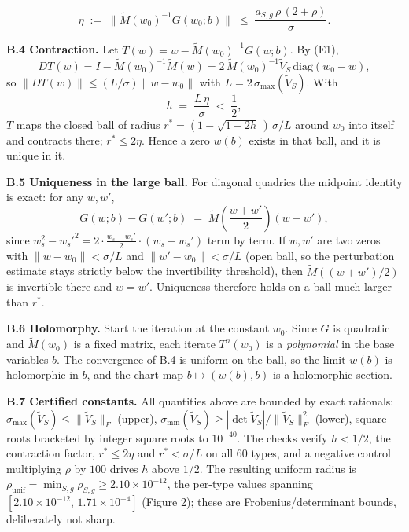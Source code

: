 \[\eta \;:=\; \lVert \tilde M(w_0)^{-1} G(w_0; b) \rVert
\;\le\; \frac{a_{S,g}\,\rho\,(2 + \rho)}{\sigma}.\]

\textbf{B.4 Contraction.} Let \(T(w) = w - \tilde M(w_0)^{-1} G(w; b)\). By (E1), \[DT(w) = I - \tilde M(w_0)^{-1}\tilde M(w)
= 2\,\tilde M(w_0)^{-1} \tilde V_S \,\mathrm{diag}(w_0 - w),\] so \(\lVert DT(w) \rVert \le (L/\sigma)\lVert w - w_0 \rVert\) with \(L = 2\,\sigma_{\max}(\tilde V_S)\). With \[h \;=\; \frac{L\,\eta}{\sigma} \;<\; \frac{1}{2},\] \(T\) maps the closed ball of radius \(r^* = (1 - \sqrt{1 - 2h}\,)\,\sigma/L\) around \(w_0\) into itself and contracts there; \(r^* \le 2\eta\). Hence a zero \(w(b)\) exists in that ball, and it is unique in it.

\textbf{B.5 Uniqueness in the large ball.} For diagonal quadrics the midpoint identity is exact: for any \(w, w'\), \[G(w; b) - G(w'; b) \;=\; \tilde M\!\left(\frac{w + w'}{2}\right)(w - w'),\] since \(w_s^2 - w_s'^2 = 2 \cdot \frac{w_s + w_s'}{2} \cdot (w_s - w_s')\) term by term. If \(w, w'\) are two zeros with \(\lVert w - w_0 \rVert < \sigma/L\) and \(\lVert w' - w_0 \rVert < \sigma/L\) (open ball, so the perturbation estimate stays strictly below the invertibility threshold), then \(\tilde M((w+w')/2)\) is invertible there and \(w = w'\). Uniqueness therefore holds on a ball much larger than \(r^*\).

\textbf{B.6 Holomorphy.} Start the iteration at the constant \(w_0\). Since \(G\) is quadratic and \(\tilde M(w_0)\) is a fixed matrix, each iterate \(T^n(w_0)\) is a \emph{polynomial} in the base variables \(b\). The convergence of B.4 is uniform on the ball, so the limit \(w(b)\) is holomorphic in \(b\), and the chart map \(b \mapsto (w(b), b)\) is a holomorphic section.

\textbf{B.7 Certified constants.} All quantities above are bounded by exact rationals: \(\sigma_{\max}(\tilde V_S) \le \lVert \tilde V_S \rVert_F\) (upper), \(\sigma_{\min}(\tilde V_S) \ge |\det \tilde V_S| /
\lVert \tilde V_S \rVert_F^2\) (lower), square roots bracketed by integer square roots to \(10^{-40}\). The checks verify \(h < 1/2\), the contraction factor, \(r^* \le 2\eta\) and \(r^* < \sigma/L\) on all \(60\) types, and a negative control multiplying \(\rho\) by \(100\) drives \(h\) above \(1/2\). The resulting uniform radius is \(\rho_{\mathrm{unif}} = \min_{S,g} \rho_{S,g} \ge 2.10 \times 10^{-12}\), the per-type values spanning \([2.10 \times 10^{-12},\, 1.71 \times 10^{-4}]\) (Figure 2); these are Frobenius/determinant bounds, deliberately not sharp.

